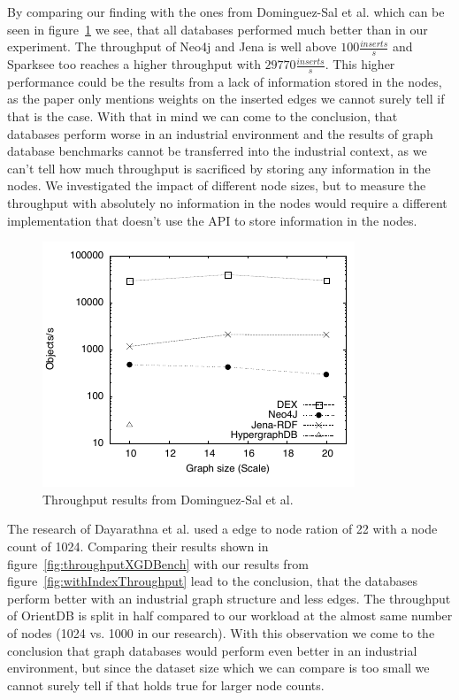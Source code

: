 By comparing our finding with the ones from Dominguez-Sal et al.\cite{TaoShen} which can be seen in figure~\ref{fig:throughputShen} we see,
that all databases performed much better than in our experiment.
The throughput of Neo4j and Jena is well above $ 100 \frac{inserts}{s} $ and Sparksee too reaches a higher throughput with $ 29770 \frac{inserts}{s} $.
This higher performance could be the results from a lack of information stored in the nodes,
as the paper only mentions weights on the inserted edges we cannot surely tell if that is the case.
With that in mind we can come to the conclusion,
that databases perform worse in an industrial environment and the results of graph database benchmarks cannot be transferred into the industrial context,
as we can't tell how much throughput is sacrificed by storing any information in the nodes.
We investigated the impact of different node sizes,
but to measure the throughput with absolutely no information in the nodes would require a different implementation that doesn't use the API to store information in the nodes.

\begin{figure}[!h]
  \centering
  \includegraphics[width=.8\textwidth]{images/benchmarks/ShenResultsInsert}
  \caption{Throughput results from Dominguez-Sal et al.\cite{TaoShen}}
  \label{fig:throughputShen}
\end{figure}

The research of Dayarathna et al.\cite{Dayarathna2012} used a edge to node ration of 22 with a node count of 1024.
Comparing their results shown in figure~\ref{fig:throughputXGDBench} with our results from figure~\ref{fig:withIndexThroughput} lead to the conclusion,
that the databases perform better with an industrial graph structure and less edges.
The throughput of OrientDB is split in half compared to our workload at the almost same number of nodes (1024 vs. 1000 in our research).
With this observation we come to the conclusion that graph databases would perform even better in an industrial environment,
but since the dataset size which we can compare is too small we cannot surely tell if that holds true for larger node counts.

